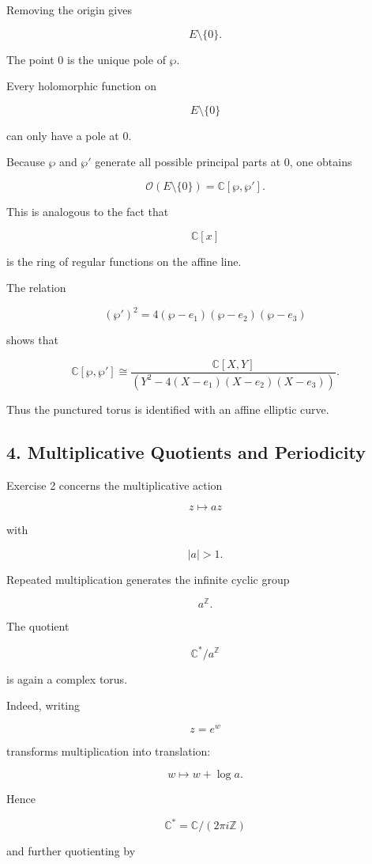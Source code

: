 \documentclass[12pt,a4paper]{article}
\theoremstyle{notespace}
\begin{document}
Removing the origin gives

\[
E\setminus\{0\}.
\]

The point \(0\) is the unique pole of \(\wp\).

Every holomorphic function on

\[
E\setminus\{0\}
\]

can only have a pole at \(0\).

Because \(\wp\) and \(\wp'\) generate all possible principal parts at \(0\), one obtains

\[
\mathcal O(E\setminus\{0\})
=
\mathbb C[\wp,\wp'].
\]

This is analogous to the fact that

\[
\mathbb C[x]
\]

is the ring of regular functions on the affine line.

The relation

\[
(\wp')^2
=
4(\wp-e_1)(\wp-e_2)(\wp-e_3)
\]

shows that

\[
\mathbb C[\wp,\wp']
\cong
\frac{
	\mathbb C[X,Y]
}{
	(Y^2-4(X-e_1)(X-e_2)(X-e_3))
}.
\]

Thus the punctured torus is identified with an affine elliptic curve.

\subsection{4. Multiplicative Quotients and Periodicity}

Exercise 2 concerns the multiplicative action

\[
z\mapsto az
\]

with

\[
|a|>1.
\]

Repeated multiplication generates the infinite cyclic group

\[
a^{\mathbb Z}.
\]

The quotient

\[
\mathbb C^*/a^{\mathbb Z}
\]

is again a complex torus.

Indeed, writing

\[
z=e^w
\]

transforms multiplication into translation:

\[
w\mapsto w+\log a.
\]

Hence

\[
\mathbb C^*
=
\mathbb C/(2\pi i\mathbb Z)
\]

and further quotienting by
\end{document}
